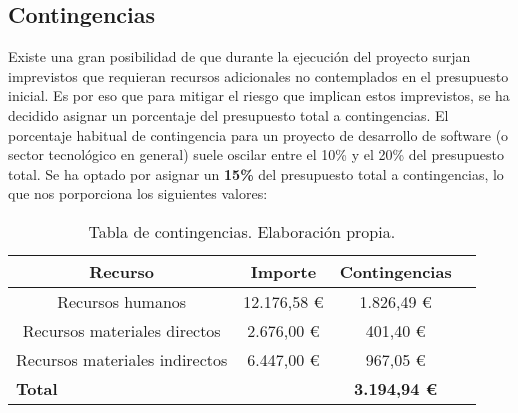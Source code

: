 \subsection{Contingencias}
Existe una gran posibilidad de que durante la ejecución del proyecto surjan imprevistos que 
requieran recursos adicionales no contemplados en el presupuesto inicial. Es por eso que 
para mitigar el riesgo que implican estos imprevistos, se ha decidido asignar un porcentaje 
del presupuesto total a contingencias. El porcentaje habitual de contingencia para un proyecto 
de desarrollo de software (o sector tecnológico en general) suele oscilar entre el 10\% y el 20\% 
del presupuesto total. Se ha optado por asignar un \textbf{15\%} del presupuesto total a contingencias, 
lo que nos porporciona los siguientes valores:


\begin{table}[H]
    \begin{center}
    \begin{tabular}{|c|c|c|c|}
        \hline
        \textbf{Recurso} & \textbf{Importe} & \textbf{Contingencias} \\ 
        \hline
        Recursos humanos & 12.176,58 € & 1.826,49 € \\
        Recursos materiales directos & 2.676,00 € & 401,40 € \\
        Recursos materiales indirectos  & 6.447,00 € & 967,05 € \\
        \hline
        \multicolumn{2}{|l|}{\textbf{Total}}  & \textbf{3.194,94 €} \\
        \hline
    \end{tabular}
    \caption{Tabla de contingencias. Elaboración propia.}
    \label{tab:calculo_contingencias}
    \end{center}
\end{table}